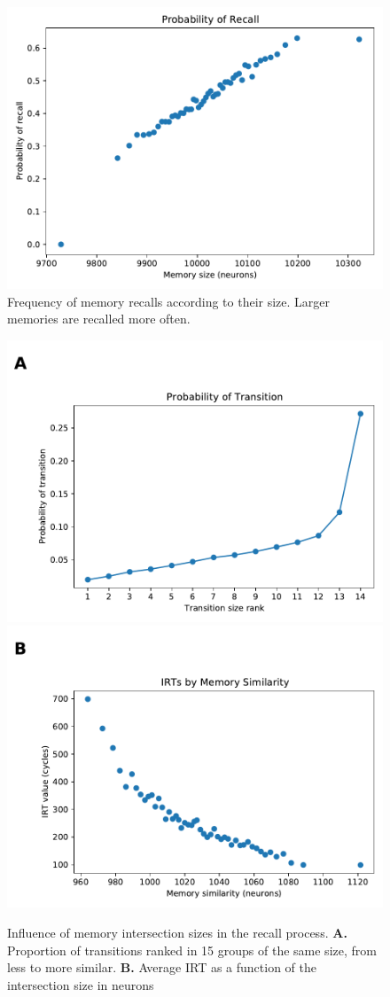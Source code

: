     \begin{figure}
        \centering
        \includegraphics[width=\textwidth]{graphics/probability_recall.pdf}
        \caption{
        Frequency of memory recalls according to their size.
        Larger memories are recalled more often.
        }
        \label{fig:probability_recall}
    \end{figure}
    \clearpage
    
    \begin{figure}
        \centering
        \includegraphics[width=.68\textwidth]{graphics/transitions_probability.pdf}
        \includegraphics[width=.68\textwidth]{graphics/transitions_irt.pdf}
        \caption{
        Influence of memory intersection sizes in the recall process.
        \textbf{A.} Proportion of transitions ranked in 15 groups of the same size, from less to more similar.
        \textbf{B.} Average IRT as a function of the intersection size in neurons
        }
        \label{fig:recall_performance_transitions}
    \end{figure}
    \clearpage
    
